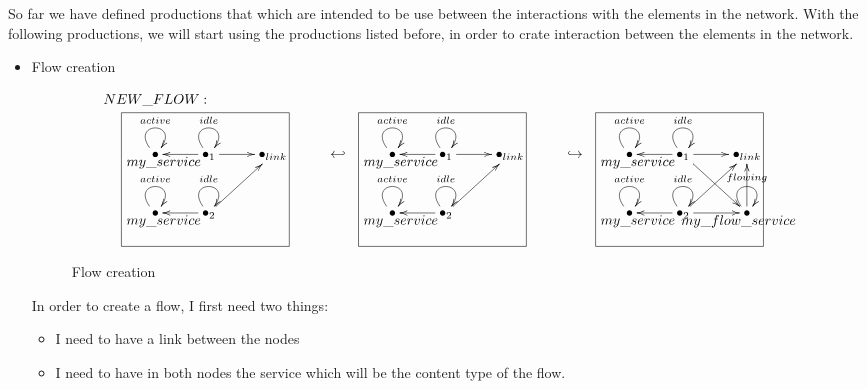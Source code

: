 \documentclass[envcountsect,runningheads]{llncs}
\begin{document}
  So far we have defined productions that which are intended to be use between the interactions 
  with the elements in the network. With the following productions, we will start using the productions
  listed before, in order to crate interaction between the elements in the network. \\
  
  \begin{itemize}
    \item Flow creation
  \begin{figure}[H]
    \[
       \xymatrix@C=25pt@R=30pt
       {
         {}\POS[]-<0pc,0pc>\drop{NEW\_FLOW:}
         \\
         {\bullet}\ar@(ul,ur)^{active} \POS[]-<-.5pc,.5pc> \drop{my\_service} &
         {\bullet}_{1}\ar@(ul,ur)^{idle}\ar@{->}[l]\ar@{->}[r] &
         {\bullet}_{link}
         & {\hookleftarrow} & 
         {\bullet}\ar@(ul,ur)^{active} \POS[]-<-.5pc,.5pc> \drop{my\_service} &
         {\bullet}_{1}\ar@(ul,ur)^{idle}\ar@{->}[l]\ar@{->}[r] &
         {\bullet}_{link} 
         & {\hookrightarrow} & 
         {\bullet}\ar@(ul,ur)^{active} \POS[]-<-.5pc,.5pc> \drop{my\_service} &
         {\bullet}_{1}\ar@(ul,ur)^{idle}\ar@{->}[l]\ar@{->}[r]\ar@{->}[dr] &
         {\bullet}_{link}
         \\
         {\bullet}\ar@(ul,ur)^{active}\POS[]-<-.5pc,.5pc> \drop{my\_service} \POS[]+<3pc,2pc>*+=<10pc,8pc>[F-]{} &
         {\bullet}_{2}\ar@(ul,ur)^{idle}\ar@{->}[l]\ar@{->}[ur]
         & & &
         {\bullet}\ar@(ul,ur)^{active}\POS[]-<-.5pc,.5pc> \drop{my\_service} \POS[]+<3pc,2pc>*+=<10pc,8pc>[F-]{} &
         {\bullet}_{2}\ar@(ul,ur)^{idle}\ar@{->}[l]\ar@{->}[ur]
         & & &
        {\bullet}\ar@(ul,ur)^{active}\POS[]-<-.5pc,.5pc> \drop{my\_service} \POS[]+<3pc,2pc>*+=<10pc,8pc>[F-]{} &
         {\bullet}_{2}\ar@(ul,ur)^{idle}\ar@{->}[l]\ar@{->}[ur]\ar@{->}[r] &
         {\bullet}\ar@(ul,ur)^{flowing}\ar@{->}[u] \POS[]-<.5pc,.5pc> \drop{my\_flow\_service}
      }
    \]
    \caption{Flow creation}
    \protect\label{fig:flowcreation}
  \end{figure}
  In order to create a flow, I first need two things: 
  \begin{itemize}
    \item I need to have a link between the nodes
    \item I need to have in both nodes the service which will be the content type of the flow.  
   \end{itemize}
  

\end{itemize}
\end{document}
